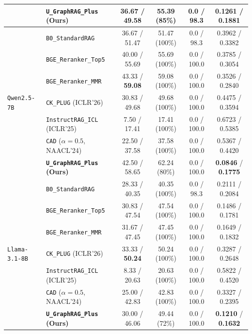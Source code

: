\documentclass[11pt]{article}
\begin{document}
\begin{table}[t]
{{\begin{tabular}{llcccc}
& \textbf{\texttt{U\_GraphRAG\_Plus} (Ours)} & 36.67 / 49.58 & 55.39 (85\%) & 0.0 / 98.3 & \textbf{0.1261} / \textbf{0.1881} \\
\midrule
\multirow{7}{*}{\texttt{Qwen2.5-7B}}
& \texttt{B0\_StandardRAG} & 36.67 / 51.47 & 51.47 (100\%) & 0.0 / 98.3 & 0.3962 / 0.3382 \\
& \texttt{BGE\_Reranker\_Top5} & 40.00 / 55.69 & 55.69 (100\%) & 0.0 / 100.0 & 0.3785 / 0.3054 \\
& \texttt{BGE\_Reranker\_MMR} & 43.33 / \textbf{59.08} & 59.08 (100\%) & 0.0 / 100.0 & 0.3526 / 0.2840 \\
& \texttt{CK\_PLUG} (ICLR'26) & 30.83 / 49.68 & 49.68 (100\%) & 0.0 / 100.0 & 0.4475 / 0.3594 \\
& \texttt{InstructRAG\_ICL} (ICLR'25) & 7.50 / 17.41 & 17.41 (100\%) & 0.0 / 100.0 & 0.6723 / 0.5385 \\
& \texttt{CAD} ($\alpha=0.5$, NAACL'24) & 22.50 / 37.58 & 37.58 (100\%) & 0.0 / 100.0 & 0.5367 / 0.4420 \\
& \textbf{\texttt{U\_GraphRAG\_Plus} (Ours)} & 42.50 / 58.65 & 62.24 (80\%) & 0.0 / 100.0 & \textbf{0.0846} / \textbf{0.1775} \\
\midrule
\multirow{7}{*}{\texttt{Llama-3.1-8B}}
& \texttt{B0\_StandardRAG} & 28.33 / 40.35 & 40.35 (100\%) & 0.0 / 98.3 & 0.2111 / 0.2084 \\
& \texttt{BGE\_Reranker\_Top5} & 30.83 / 47.54 & 47.54 (100\%) & 0.0 / 100.0 & 0.1486 / 0.1781 \\
& \texttt{BGE\_Reranker\_MMR} & 31.67 / 47.45 & 47.45 (100\%) & 0.0 / 100.0 & 0.1649 / 0.1832 \\
& \texttt{CK\_PLUG} (ICLR'26) & 33.33 / \textbf{50.24} & 50.24 (100\%) & 0.0 / 100.0 & 0.3287 / 0.2648 \\
& \texttt{InstructRAG\_ICL} (ICLR'25) & 8.33 / 20.63 & 20.63 (100\%) & 0.0 / 100.0 & 0.5822 / 0.4520 \\
& \texttt{CAD} ($\alpha=0.5$, NAACL'24) & 25.00 / 42.83 & 42.83 (100\%) & 0.0 / 100.0 & 0.3327 / 0.2395 \\
& \textbf{\texttt{U\_GraphRAG\_Plus} (Ours)} & 30.00 / 46.06 & 49.44 (72\%) & 0.0 / 100.0 & \textbf{0.1210} / \textbf{0.1632} \\
\bottomrule
\end{tabular}
}}
\end{table}
\end{document}
